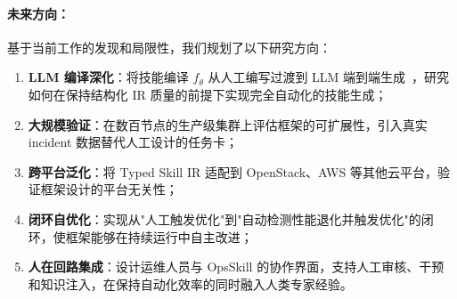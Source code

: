 \documentclass[11pt,a4paper]{ctexart}
\begin{document}
\paragraph{未来方向：}
基于当前工作的发现和局限性，我们规划了以下研究方向：
\begin{enumerate}[leftmargin=2em]
  \item \textbf{LLM 编译深化}：将技能编译 $f_\theta$ 从人工编写过渡到 LLM 端到端生成~\cite{openai2023gpt4,touvron2023llama}，研究如何在保持结构化 IR 质量的前提下实现完全自动化的技能生成；
  \item \textbf{大规模验证}：在数百节点的生产级集群上评估框架的可扩展性，引入真实 incident 数据替代人工设计的任务卡；
  \item \textbf{跨平台泛化}：将 Typed Skill IR 适配到 OpenStack、AWS 等其他云平台，验证框架设计的平台无关性；
  \item \textbf{闭环自优化}：实现从"人工触发优化"到"自动检测性能退化并触发优化"的闭环，使框架能够在持续运行中自主改进；
  \item \textbf{人在回路集成}：设计运维人员与 OpsSkill 的协作界面，支持人工审核、干预和知识注入，在保持自动化效率的同时融入人类专家经验。
\end{enumerate}



\end{document}
